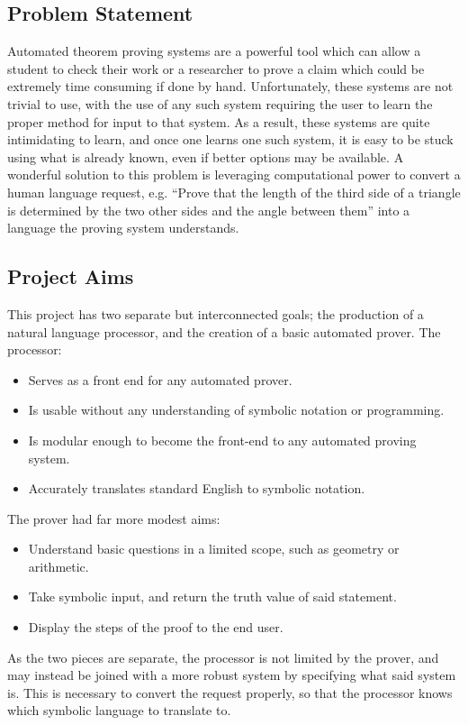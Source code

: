 \documentclass[12pt]{article}
\begin{document}
\subsection{Problem Statement}
Automated theorem proving systems are a powerful tool which can allow a student to check their work or a researcher to prove a claim which could be extremely time consuming if done by hand. Unfortunately, these systems are not trivial to use, with the use of any such system requiring the user to learn the proper method for input to that system. As a result, these systems are quite intimidating to learn, and once one learns one such system, it is easy to be stuck using what is already known, even if better options may be available. A wonderful solution to this problem is leveraging computational power to convert a human language request, e.g. ``Prove that the length of the third side of a triangle is determined by the two other sides and the angle between them'' into a language the proving system understands.


\subsection{Project Aims}
This project has two separate but interconnected goals; the production of a natural language processor, and the creation of a basic automated prover. The processor:
\begin{itemize}
\item{Serves as a front end for any automated prover.}
\item{Is usable without any understanding of symbolic notation or programming.}
\item{Is modular enough to become the front-end to any automated proving system.}
\item{Accurately translates standard English to symbolic notation.}
\end{itemize}

The prover had far more modest aims:
\begin{itemize}
\item{Understand basic questions in a limited scope, such as geometry or arithmetic.}
\item{Take symbolic input, and return the truth value of said statement.}
\item{Display the steps of the proof to the end user.}
\end{itemize}

As the two pieces are separate, the processor is not limited by the prover, and may instead be joined with a more robust system by specifying what said system is. This is necessary to convert the request properly, so that the processor knows which symbolic language to translate to.
\end{document}
